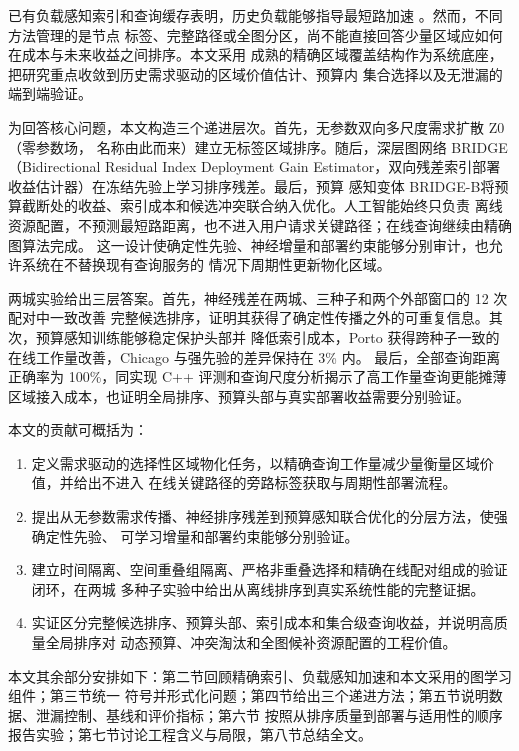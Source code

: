 \documentclass[UTF8,a4paper,10pt,twocolumn]{ctexart}
\newcommand{\zmethod}{Z0}
\newcommand{\gmethod}{BRIDGE}
\newcommand{\bmethod}{BRIDGE-B}
\begin{document}
已有负载感知索引和查询缓存表明，历史负载能够指导最短路加速
\citep{wan2022wcf,dan2025fahl,thomsen2012cache,li2020cache}。然而，不同方法管理的是节点
标签、完整路径或全图分区，尚不能直接回答少量区域应如何在成本与未来收益之间排序。本文采用
成熟的精确区域覆盖结构作为系统底座，把研究重点收敛到历史需求驱动的区域价值估计、预算内
集合选择以及无泄漏的端到端验证。

为回答核心问题，本文构造三个递进层次。首先，无参数双向多尺度需求扩散 \zmethod（零参数场，
名称由此而来）建立无标签区域排序。随后，深层图网络 \gmethod（Bidirectional Residual Index
Deployment Gain Estimator，双向残差索引部署收益估计器）在冻结先验上学习排序残差。最后，预算
感知变体 \bmethod 将预算截断处的收益、索引成本和候选冲突联合纳入优化。人工智能始终只负责
离线资源配置，不预测最短路距离，也不进入用户请求关键路径；在线查询继续由精确图算法完成。
这一设计使确定性先验、神经增量和部署约束能够分别审计，也允许系统在不替换现有查询服务的
情况下周期性更新物化区域。

两城实验给出三层答案。首先，神经残差在两城、三种子和两个外部窗口的 12 次配对中一致改善
完整候选排序，证明其获得了确定性传播之外的可重复信息。其次，预算感知训练能够稳定保护头部并
降低索引成本，Porto 获得跨种子一致的在线工作量改善，Chicago 与强先验的差异保持在 3\% 内。
最后，全部查询距离正确率为 100\%，同实现 C++ 评测和查询尺度分析揭示了高工作量查询更能摊薄
区域接入成本，也证明全局排序、预算头部与真实部署收益需要分别验证。

本文的贡献可概括为：

\begin{enumerate}
  \item 定义需求驱动的选择性区域物化任务，以精确查询工作量减少量衡量区域价值，并给出不进入
  在线关键路径的旁路标签获取与周期性部署流程。
  \item 提出从无参数需求传播、神经排序残差到预算感知联合优化的分层方法，使强确定性先验、
  可学习增量和部署约束能够分别验证。
  \item 建立时间隔离、空间重叠组隔离、严格非重叠选择和精确在线配对组成的验证闭环，在两城
  多种子实验中给出从离线排序到真实系统性能的完整证据。
  \item 实证区分完整候选排序、预算头部、索引成本和集合级查询收益，并说明高质量全局排序对
  动态预算、冲突淘汰和全图候补资源配置的工程价值。
\end{enumerate}

本文其余部分安排如下：第二节回顾精确索引、负载感知加速和本文采用的图学习组件；第三节统一
符号并形式化问题；第四节给出三个递进方法；第五节说明数据、泄漏控制、基线和评价指标；第六节
按照从排序质量到部署与适用性的顺序报告实验；第七节讨论工程含义与局限，第八节总结全文。
\end{document}
